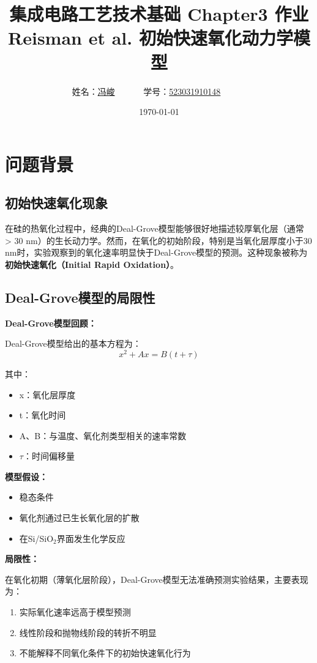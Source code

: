 \documentclass[UTF8,12pt,a4paper]{ctexart}
\title{集成电路工艺技术基础 Chapter3 作业\\Reisman et al. 初始快速氧化动力学模型}
\author{
	姓名：\underline{冯峻}~~~~~~
	学号：\underline{523031910148}~~~~~~}
\date{\today}
\begin{document}
\fancyfoot[C]{\thepage}

\maketitle
\tableofcontents
\newpage

\section{问题背景}

\subsection{初始快速氧化现象}

在硅的热氧化过程中，经典的Deal-Grove模型能够很好地描述较厚氧化层（通常 > 30 nm）的生长动力学。然而，在氧化的初始阶段，特别是当氧化层厚度小于30 nm时，实验观察到的氧化速率明显快于Deal-Grove模型的预测。这种现象被称为\textbf{初始快速氧化（Initial Rapid Oxidation）}。

\subsection{Deal-Grove模型的局限性}

\textbf{Deal-Grove模型回顾：}

Deal-Grove模型给出的基本方程为：
\begin{equation}
x^2 + Ax = B(t + \tau)
\end{equation}

其中：
\begin{itemize}
    \item x：氧化层厚度
    \item t：氧化时间
    \item A、B：与温度、氧化剂类型相关的速率常数
    \item $\tau$：时间偏移量
\end{itemize}

\textbf{模型假设：}
\begin{itemize}
    \item 稳态条件
    \item 氧化剂通过已生长氧化层的扩散
    \item 在Si/SiO$_2$界面发生化学反应
\end{itemize}

\textbf{局限性：}

在氧化初期（薄氧化层阶段），Deal-Grove模型无法准确预测实验结果，主要表现为：
\begin{enumerate}
    \item 实际氧化速率远高于模型预测
    \item 线性阶段和抛物线阶段的转折不明显
    \item 不能解释不同氧化条件下的初始快速氧化行为
\end{enumerate}
\end{document}
